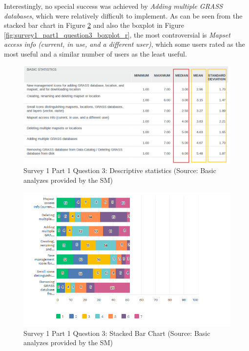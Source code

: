 \documentclass[a4paper,10pt,twoside]{article}
\begin{document}
Interestingly, no special success was achieved by \textit{Adding
  multiple GRASS databases}, which were relatively difficult to
implement. As can be seen from the stacked bar chart in Figure
\ref{fig:survey1_part1_question3_histogram} and also the boxplot in
Figure \ref{fig:survey1_part1_question3_boxplot_r}, the most
controversial is \textit{Mapset access info (current, in use, and a
  different user)}, which some users rated as the most useful and a
similar number of users as the least useful.

\vspace{0.3cm}
\begin{figure}[hbt!] 
\begin{center}
\includegraphics[width=17cm]{../surveys/analyzed_data/survey1_part1_question3_descriptive_stats_sm.png} 
\caption[Survey 1 Part 1 Question 3: Descriptive statistics]{Survey 1 Part 1 Question 3: Descriptive statistics (Source: Basic analyzes provided by the SM)}
\label{fig:survey1_part1_question3_descriptive_stats_sm}
\end{center}
\end{figure}

\vspace{0.3cm}
\begin{figure}[hbt!] 
\begin{center}
\includegraphics[width=17cm]{../surveys/analyzed_data/survey1_part1_question3_histogram.png} 
\caption[Survey 1 Part 1 Question 3: Stacked Bar Chart ]{Survey 1 Part 1 Question 3: Stacked Bar Chart (Source: Basic analyzes provided by the SM)}
\label{fig:survey1_part1_question3_histogram}
\end{center}
\end{figure}
\end{document}
